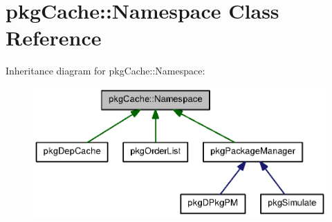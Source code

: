 \section{pkg\-Cache\-:\-:\-Namespace \-Class \-Reference}
\label{classpkgCache_1_1Namespace}


\-Inheritance diagram for pkg\-Cache\-:\-:\-Namespace\-:
\nopagebreak
\begin{figure}[H]
\begin{center}
\leavevmode
\includegraphics[width=350pt]{classpkgCache_1_1Namespace__inherit__graph}
\end{center}
\end{figure}
